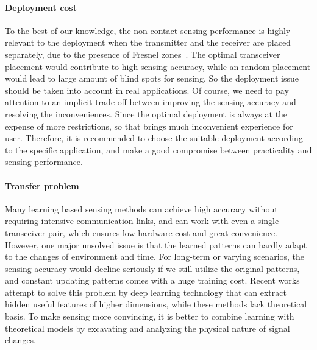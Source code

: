 \paragraph*{Deployment cost} To the best of our knowledge, the non-contact sensing performance is highly relevant to the deployment when
the transmitter and the receiver are placed separately, due to the presence of Fresnel zones~\cite{wang2016human}. The optimal transceiver
placement would contribute to high sensing accuracy, while an random placement would lead to large amount of blind spots for sensing. So
the deployment issue should be taken into account in real applications. Of course, we need to pay attention to an implicit trade-off
between improving the sensing accuracy and resolving the inconveniences. Since the optimal deployment is always at the expense of more
restrictions, so that brings much inconvenient experience for user. Therefore, it is recommended to choose the suitable deployment
according to the specific application, and make a good compromise between practicality and sensing performance.

\paragraph*{Transfer problem} Many learning based sensing methods can achieve high accuracy without requiring intensive communication
links, and can work with even a single transceiver pair, which ensures low hardware cost and great convenience. However, one major unsolved
issue is that the learned patterns can hardly adapt to the changes of environment and time. For long-term or varying scenarios, the sensing
accuracy would decline seriously if we still utilize the original patterns, and constant updating patterns comes with a huge training cost.
Recent works attempt to solve this problem by deep learning technology that can extract hidden useful features of higher dimensions, while
these methods lack theoretical basis. To make sensing more convincing, it is better to combine learning with theoretical models by
excavating and analyzing the physical nature of signal changes.

